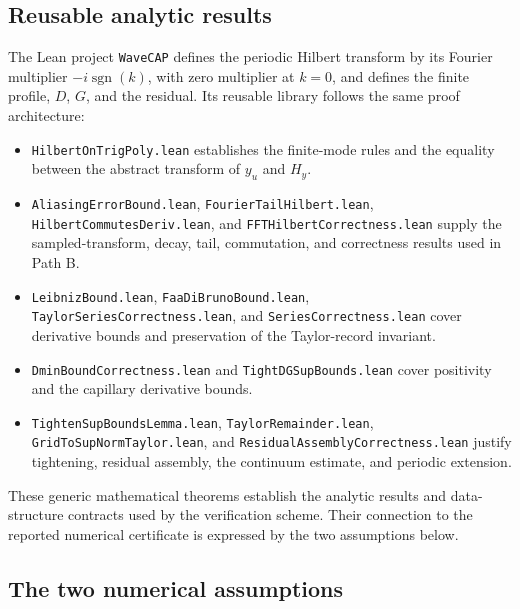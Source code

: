 \documentclass[11pt]{article}
\numberwithin{equation}{section}
\newcommand{\HH}{H_y}
\newcommand{\code}[1]{\texttt{#1}}
\begin{document}
\subsection{Reusable analytic results}

The Lean project \code{WaveCAP} defines the periodic Hilbert transform by
its Fourier multiplier $-i\operatorname{sgn}(k)$, with zero multiplier at
$k=0$, and defines the finite profile, $D$, $G$, and the residual.
Its reusable library follows the same proof architecture:
\begin{itemize}
 \item \code{HilbertOnTrigPoly.lean} establishes the finite-mode rules
 and the equality between the abstract transform of $y_u$ and $\HH$.
 \item \code{AliasingErrorBound.lean},
 \code{FourierTailHilbert.lean},
 \code{HilbertCommutesDeriv.lean}, and
 \code{FFTHilbertCorrectness.lean} supply the sampled-transform,
 decay, tail, commutation, and correctness results used in Path B.
 \item \code{LeibnizBound.lean}, \code{FaaDiBrunoBound.lean},
 \code{TaylorSeriesCorrectness.lean}, and \code{SeriesCorrectness.lean}
 cover derivative bounds and preservation of the Taylor-record invariant.
 \item \code{DminBoundCorrectness.lean} and
 \code{TightDGSupBounds.lean} cover positivity and the capillary
 derivative bounds.
 \item \code{TightenSupBoundsLemma.lean},
 \code{TaylorRemainder.lean}, \code{GridToSupNormTaylor.lean}, and
 \code{ResidualAssemblyCorrectness.lean} justify tightening,
 residual assembly, the continuum estimate, and periodic extension.
\end{itemize}
These generic mathematical theorems establish the analytic results and
data-structure contracts used by the verification scheme. Their connection
to the reported numerical certificate is expressed by the two assumptions
below.

\subsection{The two numerical assumptions}
\label{sec:trust}
\end{document}
